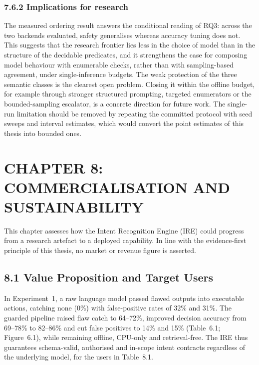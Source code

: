 \documentclass[
]{article}
\begin{document}
\hypertarget{implications-for-research}{%
\subsubsection{7.6.2 Implications for
research}\label{implications-for-research}}

The measured ordering result answers the conditional reading of RQ3:
across the two backends evaluated, safety generalises whereas accuracy
tuning does not. This suggests that the research frontier lies less in
the choice of model than in the structure of the decidable predicates,
and it strengthens the case for composing model behaviour with
enumerable checks, rather than with sampling-based agreement, under
single-inference budgets. The weak protection of the three semantic
classes is the clearest open problem. Closing it within the offline
budget, for example through stronger structured prompting, targeted
enumerators or the bounded-sampling escalator, is a concrete direction
for future work. The single-run limitation should be removed by
repeating the committed protocol with seed sweeps and interval
estimates, which would convert the point estimates of this thesis into
bounded ones.

\hypertarget{chapter-8-commercialisation-and-sustainability}{%
\section{CHAPTER 8: COMMERCIALISATION AND
SUSTAINABILITY}\label{chapter-8-commercialisation-and-sustainability}}

This chapter assesses how the Intent Recognition Engine (IRE) could
progress from a research artefact to a deployed capability. In line with
the evidence-first principle of this thesis, no market or revenue figure
is asserted.

\hypertarget{value-proposition-and-target-users}{%
\subsection{8.1 Value Proposition and Target
Users}\label{value-proposition-and-target-users}}

In Experiment~1, a raw language model passed flawed outputs into
executable actions, catching none (0\%) with false-positive rates of
32\% and 31\%. The guarded pipeline raised flaw catch to 64--72\%,
improved decision accuracy from 69--78\% to 82--86\% and cut false
positives to 14\% and 15\% (Table~6.1; Figure~6.1), while remaining
offline, CPU-only and retrieval-free. The IRE thus guarantees
schema-valid, authorised and in-scope intent contracts regardless of the
underlying model, for the users in Table~8.1.
\end{document}
